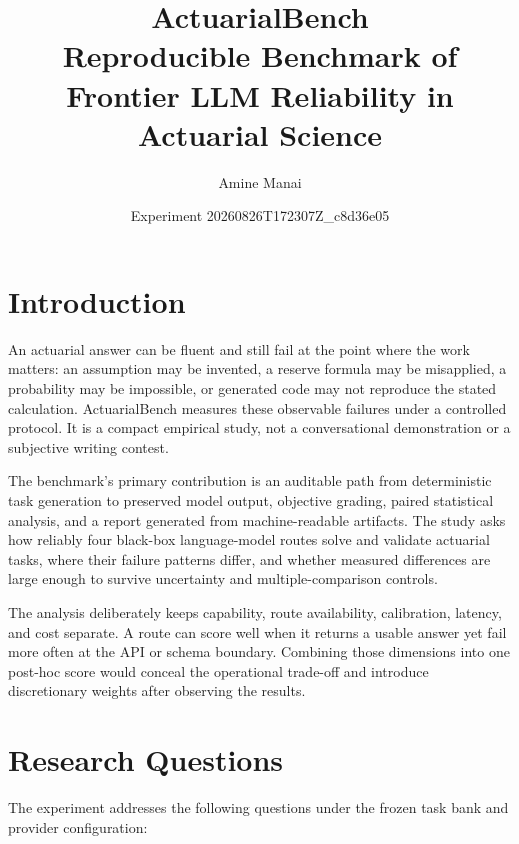 \documentclass[11pt]{article}
\title{\textbf{ActuarialBench}\\[0.35em]
\large Reproducible Benchmark of Frontier LLM Reliability in Actuarial Science}
\author{Amine Manai}
\date{Experiment 20260826T172307Z\_c8d36e05}
\begin{document}
\maketitle

\begin{abstract}

\end{abstract}

\tableofcontents

\section{Introduction}

An actuarial answer can be fluent and still fail at the point where the work matters: an assumption may be invented, a reserve formula may be misapplied, a probability may be impossible, or generated code may not reproduce the stated calculation. ActuarialBench measures these observable failures under a controlled protocol. It is a compact empirical study, not a conversational demonstration or a subjective writing contest.

The benchmark's primary contribution is an auditable path from deterministic task generation to preserved model output, objective grading, paired statistical analysis, and a report generated from machine-readable artifacts. The study asks how reliably four black-box language-model routes solve and validate actuarial tasks, where their failure patterns differ, and whether measured differences are large enough to survive uncertainty and multiple-comparison controls.

The analysis deliberately keeps capability, route availability, calibration, latency, and cost separate. A route can score well when it returns a usable answer yet fail more often at the API or schema boundary. Combining those dimensions into one post-hoc score would conceal the operational trade-off and introduce discretionary weights after observing the results.

\section{Research Questions}

The experiment addresses the following questions under the frozen task bank and provider configuration:
\end{document}
